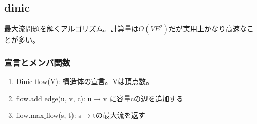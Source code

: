 \subsection{dinic}

最大流問題を解くアルゴリズム。計算量は$O(VE^2)$だが実用上かなり高速なことが多い。

\subsubsection*{宣言とメンバ関数}

\begin{enumerate}
    \item Dinic flow(V): 構造体の宣言。Vは頂点数。
    \item flow.add$\_$edge(u, v, c): u → v に容量cの辺を追加する
    \item flow.max$\_$flow(s, t): s → tの最大流を返す
\end{enumerate}

